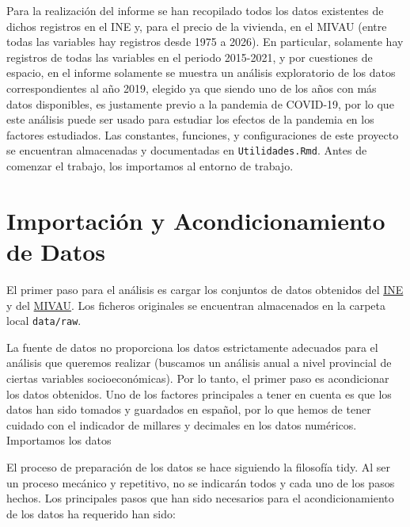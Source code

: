 \documentclass[,article,submit,moreauthors,pdftex]{Definitions/mdpi}
\begin{document}
Para la realización del informe se han recopilado todos los datos
existentes de dichos registros en el INE y, para el precio de la
vivienda, en el MIVAU (entre todas las variables hay registros desde
1975 a 2026). En particular, solamente hay registros de todas las
variables en el periodo 2015-2021, y por cuestiones de espacio, en el
informe solamente se muestra un análisis exploratorio de los datos
correspondientes al año 2019, elegido ya que siendo uno de los años con
más datos disponibles, es justamente previo a la pandemia de COVID-19,
por lo que este análisis puede ser usado para estudiar los efectos de la
pandemia en los factores estudiados. Las constantes, funciones, y
configuraciones de este proyecto se encuentran almacenadas y
documentadas en \texttt{Utilidades.Rmd}. Antes de comenzar el trabajo,
los importamos al entorno de trabajo.

\section{Importación y Acondicionamiento de
Datos}\label{importaciuxf3n-y-acondicionamiento-de-datos}

El primer paso para el análisis es cargar los conjuntos de datos
obtenidos del
\href{https://ine.es/dyngs/INEbase/listaoperaciones.htm}{INE} y del
\href{https://www.mivau.gob.es/el-ministerio/observatorios-y-estadisticas}{MIVAU}.
Los ficheros originales se encuentran almacenados en la carpeta local
\texttt{data/raw}.

La fuente de datos no proporciona los datos estrictamente adecuados para
el análisis que queremos realizar (buscamos un análisis anual a nivel
provincial de ciertas variables socioeconómicas). Por lo tanto, el
primer paso es acondicionar los datos obtenidos. Uno de los factores
principales a tener en cuenta es que los datos han sido tomados y
guardados en español, por lo que hemos de tener cuidado con el indicador
de millares y decimales en los datos numéricos. Importamos los datos

El proceso de preparación de los datos se hace siguiendo la filosofía
tidy. Al ser un proceso mecánico y repetitivo, no se indicarán todos y
cada uno de los pasos hechos. Los principales pasos que han sido
necesarios para el acondicionamiento de los datos ha requerido han sido:
\end{document}
